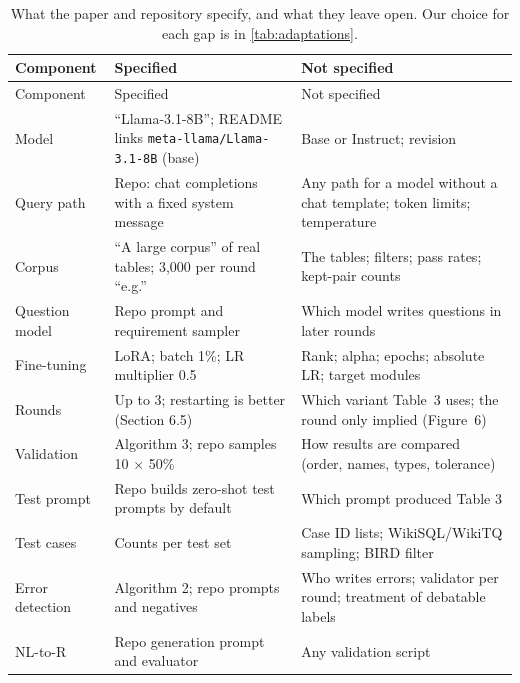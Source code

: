 {\small
{}
\begin{longtable}{@{}p{4.1cm}p{5.4cm}p{5.2cm}@{}}
\caption{What the paper and repository specify, and what they leave open. Our choice for each gap is in
\cref{tab:adaptations}.}\label{tab:gaps}\\
\toprule\rowcolor{headshade}
Component & Specified & Not specified\\\midrule\endfirsthead
\toprule\rowcolor{headshade}
Component & Specified & Not specified\\\midrule\endhead
\bottomrule\endfoot
Model & ``Llama-3.1-8B''; README links \texttt{meta-llama/Llama-3.1-8B} (base) & Base or Instruct; revision\\
Query path & Repo: chat completions with a fixed system message & Any path for a model without a chat template; token
limits; temperature\\
Corpus & ``A large corpus'' of real tables; 3,000 per round ``e.g.'' & The tables; filters; pass rates; kept-pair
counts\\
Question model & Repo prompt and requirement sampler & Which model writes questions in later rounds\\
Fine-tuning & LoRA; batch 1\%; LR multiplier 0.5 & Rank; alpha; epochs; absolute LR; target modules\\
Rounds & Up to 3; restarting is better (Section 6.5) & Which variant Table~3 uses; the round only implied (Figure~6)\\
Validation & Algorithm 3; repo samples 10 $\times$ 50\% & How results are compared (order, names, types, tolerance)\\
Test prompt & Repo builds zero-shot test prompts by default & Which prompt produced Table 3\\
Test cases & Counts per test set & Case ID lists; WikiSQL/WikiTQ sampling; BIRD filter\\
Error detection & Algorithm 2; repo prompts and negatives & Who writes errors; validator per round; treatment of
debatable labels\\
NL-to-R & Repo generation prompt and evaluator & Any validation script\\
\end{longtable}
}

